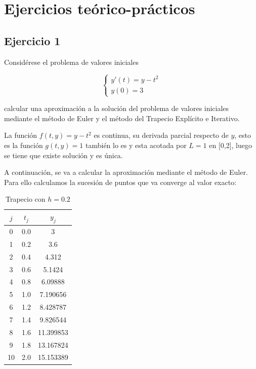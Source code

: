 \documentclass{article}
\theoremstyle{theorem-style}  %
\theoremstyle{definition-style}
\theoremstyle{example-style}
\begin{document}
\section{Ejercicios teórico-prácticos} \label{ejtp}

\subsection{Ejercicio 1} \label{ejtp1}

Considérese el problema de valores iniciales

		\begin{equation*}
			\begin{cases}
				y'(t) = y - t^2 \\
				y(0) = 3
			\end{cases}
		\end{equation*}

calcular una aproximación a la solución del problema de valores iniciales mediante el método de Euler y el método del Trapecio Explícito e Iterativo.

La función $f(t,y) = y - t^2$ es continua, su derivada parcial respecto de $y$, esto es la función $g(t,y) = 1$ también lo es y esta acotada por $L=1$ en [0,2], luego se tiene que existe solución y es única.

A continuación, se va a calcular la aproximación mediante el método de Euler. Para ello calculamos la sucesión de puntos que va converge al valor exacto:

	\begin{table}[H]
		\centering
		\begin{tabular}{|| c | c | c ||}
			\hline
			\hline $j$ &  $t_j $ & $y_j$\\
			\hline 0 & 0.0 & 3 \\
			\hline 1 & 0.2 & 3.6  \\
			\hline 2 & 0.4 & 4.312 \\
			\hline 3 & 0.6 & 5.1424 \\
			\hline 4 & 0.8 & 6.09888 \\
			\hline 5 & 1.0 & 7.190656 \\
			\hline 6 & 1.2 & 8.428787 \\
			\hline 7 & 1.4 & 9.826544 \\
			\hline 8 & 1.6 & 11.399853 \\
			\hline 9 & 1.8 & 13.167824 \\
			\hline 10 & 2.0 & 15.153389 \\
			\hline
			\hline
		\end{tabular}
		\caption{Trapecio con $h=0.2$}
		\label{table:trapecio-ejtp1.1}
	\end{table}
\end{document}
